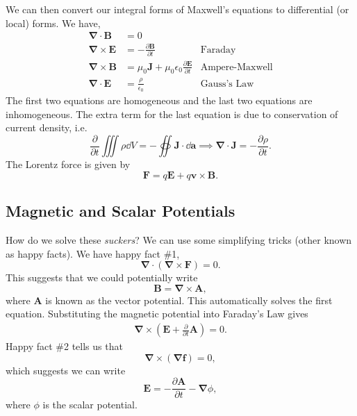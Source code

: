 \documentclass{article}
\numberwithin{equation}{section}
\begin{document}
We can then convert our integral forms of Maxwell's equations to differential (or local) forms. We have,
\begin{align}
    \bm{\nabla}\cdot \bm{B} &= 0 \\ 
    \bm{\nabla}\times \bm{E} &= -\frac{\partial \bm{B}}{\partial t} & \text{Faraday}\\ 
    \bm{\nabla} \times \bm{B} &= \mu_0 \bm{J} + \mu_0\epsilon_0 \frac{\partial \bm{E}}{\partial t} & \text{Ampere-Maxwell}\\ 
    \bm{\nabla}\cdot \bm{E} &= \frac{\rho}{\epsilon_0} & \text{Gauss's Law}
\end{align}
The first two equations are homogeneous and the last two equations are inhomogeneous. The extra term for the last equation is due to conservation of current density, i.e. 
\begin{equation}
    \frac{\partial}{\partial t}\iiint \rho \dd{V} = -\oiint \bm{J} \cdot \dd{\bm{a}} \implies \bm{\nabla}\cdot \bm{J} = -\frac{\partial\rho}{\partial t}.
\end{equation}
The Lorentz force is given by 
\begin{equation}
    \bm{F} = q\bm{E} + q\bm{v}\times \bm{B}.
\end{equation}
\subsection{Magnetic and Scalar Potentials}
How do we solve these \textit{suckers}? We can use some simplifying tricks (other known as happy facts). We have happy fact \#1,
\begin{equation}
    \bm{\nabla} \cdot (\bm{\nabla} \times \bm{F}) = 0.
\end{equation}
This suggests that we could potentially write 
\begin{equation}
    \boxed{\bm{B} = \bm{\nabla} \times \bm{A}},
\end{equation}
where $\bm{A}$ is known as the vector potential. This automatically solves the first equation. Substituting the magnetic potential into Faraday's Law gives 
\begin{align}
    \bm{\nabla}\times (\bm{E} + \frac{\partial}{\partial t}\bm{A}) = 0.
\end{align}
Happy fact \#2 tells us that 
\begin{equation}
    \bm{\nabla} \times (\bm{\nabla} \bm{f}) = 0,
\end{equation}
which suggests we can write 
\begin{equation}
    \boxed{\bm{E} = - \frac{\partial \bm{A}}{\partial t} -\bm{\nabla}\phi,}
    \label{eq:E-as-A-and-phi}
\end{equation}
where $\phi$ is the scalar potential. 
\end{document}
